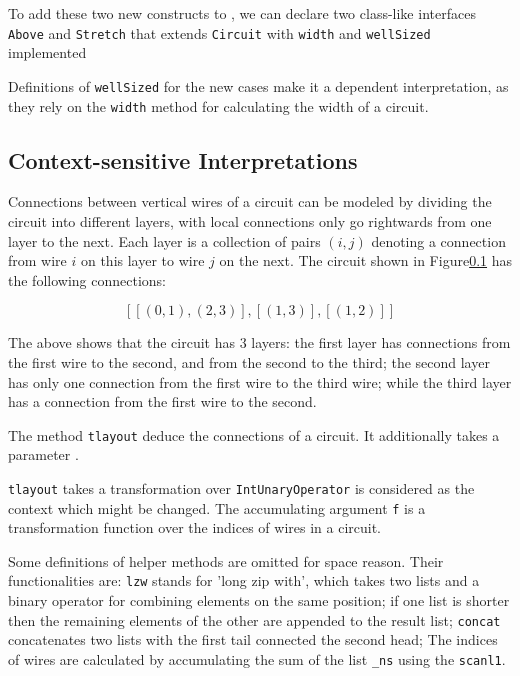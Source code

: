 To add these two new constructs to \dsl, we can declare two class-like interfaces \texttt{Above} and
\texttt{Stretch} that extends \texttt{Circuit} with \texttt{width} and
\texttt{wellSized} implemented

Definitions of \texttt{wellSized} for the new cases make it a dependent interpretation, as they
rely on the \texttt{width} method for calculating the width of a circuit.


\subsection{Context-sensitive Interpretations}
Connections between vertical wires of a circuit can be modeled by dividing the
circuit into different layers, with local connections only go rightwards from
one layer to the next. Each layer is a collection of pairs $(i,j)$ denoting a
connection from wire $i$ on this layer to wire $j$ on the next. The circuit shown in
Figure\ref{} has the following connections:

$$[[(0,1),(2,3)],[(1,3)],[(1,2)]]$$

The above shows that the circuit has 3 layers: the first layer has connections
from the first wire to the second, and from the second to the third; the second
layer has only one connection from the first wire to the third wire; while the
third layer has a connection from the first wire to the second.

The method \texttt{tlayout} deduce the connections of a circuit. It additionally
takes a parameter \texttt{}.


\texttt{tlayout} takes a transformation over \texttt{IntUnaryOperator} is considered as the context which might be changed.
The accumulating argument \texttt{f} is a transformation function over the indices of wires in a circuit.

Some definitions of helper methods are omitted for space reason.
Their functionalities are: \texttt{lzw} stands for 'long zip with', which takes two lists and a binary operator for
combining elements on the same position; if one list is shorter then the
remaining elements of the other are appended to the result list; \texttt{concat}
concatenates two lists with the first tail connected the second head;
The indices of wires are calculated by accumulating the sum of the list \texttt{\_ns} using the \texttt{scanl1}.

